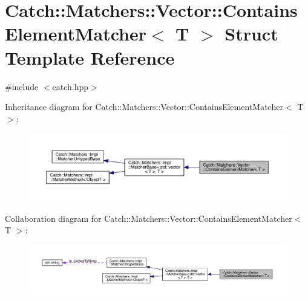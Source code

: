 \hypertarget{struct_catch_1_1_matchers_1_1_vector_1_1_contains_element_matcher}{}\section{Catch\+:\+:Matchers\+:\+:Vector\+:\+:Contains\+Element\+Matcher$<$ T $>$ Struct Template Reference}
\label{struct_catch_1_1_matchers_1_1_vector_1_1_contains_element_matcher}


{\ttfamily \#include $<$catch.\+hpp$>$}



Inheritance diagram for Catch\+:\+:Matchers\+:\+:Vector\+:\+:Contains\+Element\+Matcher$<$ T $>$\+:
\nopagebreak
\begin{figure}[H]
\begin{center}
\leavevmode
\includegraphics[width=350pt]{struct_catch_1_1_matchers_1_1_vector_1_1_contains_element_matcher__inherit__graph}
\end{center}
\end{figure}


Collaboration diagram for Catch\+:\+:Matchers\+:\+:Vector\+:\+:Contains\+Element\+Matcher$<$ T $>$\+:
\nopagebreak
\begin{figure}[H]
\begin{center}
\leavevmode
\includegraphics[width=350pt]{struct_catch_1_1_matchers_1_1_vector_1_1_contains_element_matcher__coll__graph}
\end{center}
\end{figure}
